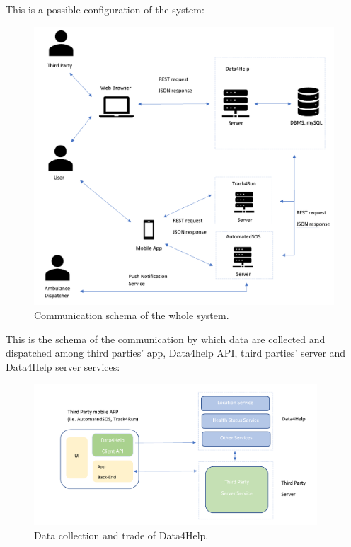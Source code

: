 \documentclass[a4paper]{article}
\begin{document}
This is a possible configuration of the system:
\begin{figure}[H]
    \centering
    \includegraphics[width=\textwidth]{communicationInterfaces1}
    \caption{Communication schema of the whole system.}
    \label{fig:my_label}
\end{figure}

This is the schema of the communication by which data are collected and dispatched among third parties' app, Data4help API, third parties' server and Data4Help server services:

\begin{figure}[H]
    \centering
    \includegraphics[height=150pt]{communicationInterfaces2}
    \caption{Data collection and trade of Data4Help.}
    \label{fig:my_label}
\end{figure}

\clearpage
\end{document}
